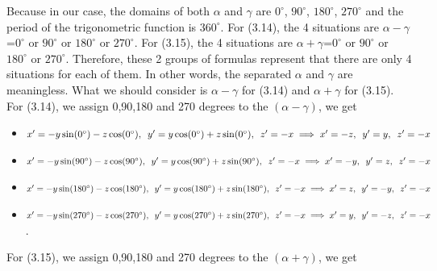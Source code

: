 Because in our case, the domains of both $\alpha$ and $\gamma$ are $0^{\circ}$, $90^{\circ}$, $180^{\circ}$, $270^{\circ}$ and the period of the trigonometric function is $360^{\circ}$. For (3.14), the 4 situations are $\alpha-\gamma$=$0^{\circ}$ or $90^{\circ}$ or $180^{\circ}$ or $270^{\circ}$. For (3.15), the 4 situations are $\alpha+\gamma$=$0^{\circ}$ or $90^{\circ}$ or $180^{\circ}$ or $270^{\circ}$.
Therefore, these 2 groups of formulas represent that there are only 4 situations for each of them. In other words, the separated $\alpha$ and $\gamma$ are meaningless. What we should consider is $\alpha-\gamma$ for (3.14) and $\alpha+\gamma$ for (3.15). For (3.14), we assign 0,90,180 and 270 degrees to the $(\alpha-\gamma)$, we get
\begin{itemize}
  \item  $x'=-y\sin(0^{\circ})-z\cos(0^{\circ}),\hspace{5pt} y'=y\cos(0^{\circ})+z\sin(0^{\circ}),\hspace{5pt} z'=-x \\\implies x'=-z,\hspace{5pt} y'=y,\hspace{5pt} z'=-x$
  \item  $x'=-y\sin(90^{\circ})-z\cos(90^{\circ}), \hspace{5pt} y'=y\cos(90^{\circ})+z\sin(90^{\circ}), \hspace{5pt} z'=-x\\\implies x'=-y,\hspace{5pt} y'=z,\hspace{5pt} z'=-x$
  \item  $x'=-y\sin(180^{\circ})-z\cos(180^{\circ}), \hspace{5pt} y'=y\cos(180^{\circ})+z\sin(180^{\circ}), \hspace{5pt} z'=-x\\\implies x'=z,\hspace{5pt} y'=-y,\hspace{5pt} z'=-x$
  \item  $x'=-y\sin(270^{\circ})-z\cos(270^{\circ}), \hspace{5pt} y'=y\cos(270^{\circ})+z\sin(270^{\circ}), \hspace{5pt} z'=-x\\\implies x'=y, \hspace{5pt}y'=-z,\hspace{5pt} z'=-x$.
  \label{3Drotation24situations1}
\end{itemize}
For (3.15), we assign 0,90,180 and 270 degrees to the $(\alpha+\gamma)$, we get
